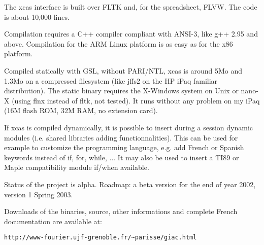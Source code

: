 \documentclass{article}
\begin{document}
The xcas interface is built over FLTK and, for the spreadsheet, FLVW. The code
is about 10,000 lines.

Compilation requires a C++ compiler compliant with ANSI-3, like g++ 2.95 and
above. Compilation for the ARM Linux platform is as easy as for the x86
platform.

Compiled statically with GSL, without PARI/NTL, xcas is around 5Mo and 1.3Mo
on a compressed filesystem (like jffs2 on the HP iPaq familiar distribution).
The static binary requires the X-Windows system on Unix or nano-X (using flnx
instead of fltk, not tested). It runs without any problem on my iPaq (16M
flash ROM, 32M RAM, no extension card).

If xcas is compiled dynamically, it is possible to insert during a session
dynamic modules (i.e. shared libraries adding functionnalities). This can be
used for example to customize the programming language, e.g. add French or
Spanish keywords instead of if, for, while, ... It may also be used to insert
a TI89 or Maple compatibility module if/when available.

Status of the project is alpha. Roadmap: a beta version for the end of year
2002, version 1 Spring 2003.

Downloads of the binaries, source, other informations and complete French
documentation are available at:
\begin{verbatim}
http://www-fourier.ujf-grenoble.fr/~parisse/giac.html
\end{verbatim}
\end{document}
